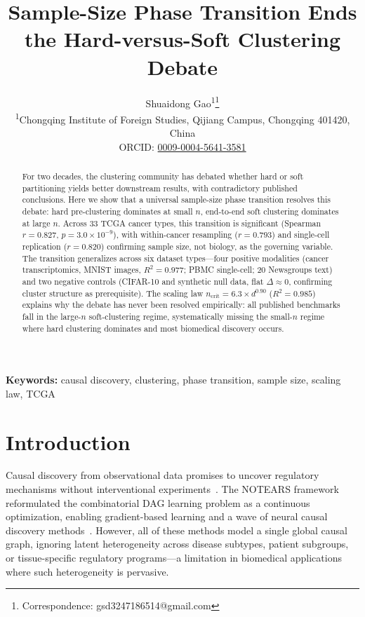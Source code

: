 \documentclass[12pt,a4paper]{article}
\title{Sample-Size Phase Transition Ends the Hard-versus-Soft Clustering Debate}
\author{Shuaidong Gao\textsuperscript{1}\thanks{Correspondence: gsd3247186514@gmail.com}\\
\textsuperscript{1}Chongqing Institute of Foreign Studies, Qijiang Campus, Chongqing 401420, China\\
ORCID: \href{https://orcid.org/0009-0004-5641-3581}{0009-0004-5641-3581}}
\date{}
\begin{document}
\doublespacing
\linenumbers
\maketitle

\begin{abstract}
For two decades, the clustering community has debated whether hard or soft partitioning yields better downstream results, with contradictory published conclusions. Here we show that a universal sample-size phase transition resolves this debate: hard pre-clustering dominates at small $n$, end-to-end soft clustering dominates at large $n$. Across 33 TCGA cancer types, this transition is significant (Spearman $r = 0.827$, $p = 3.0 \times 10^{-9}$), with within-cancer resampling ($r = 0.793$) and single-cell replication ($r = 0.820$) confirming sample size, not biology, as the governing variable. The transition generalizes across six dataset types---four positive modalities (cancer transcriptomics, MNIST images, $R^2 = 0.977$; PBMC single-cell; 20 Newsgroups text) and two negative controls (CIFAR-10 and synthetic null data, flat $\Delta \approx 0$, confirming cluster structure as prerequisite). The scaling law $n_{\text{crit}} = 6.3 \times d^{0.90}$ ($R^2 = 0.985$) explains why the debate has never been resolved empirically: all published benchmarks fall in the large-$n$ soft-clustering regime, systematically missing the small-$n$ regime where hard clustering dominates and most biomedical discovery occurs.
\end{abstract}

\noindent\textbf{Keywords:} causal discovery, clustering, phase transition, sample size, scaling law, TCGA

\section{Introduction}

Causal discovery from observational data promises to uncover regulatory mechanisms without interventional experiments~\cite{pearl2009causality, spirtes2000causation}. The NOTEARS framework~\cite{zheng2018dags} reformulated the combinatorial DAG learning problem as a continuous optimization, enabling gradient-based learning and a wave of neural causal discovery methods~\cite{yu2019daggnn, ng2020golem, lachapelle2019grandag, shimizu2006lingam, bello2022dagma, lippe2022causal}. However, all of these methods model a single global causal graph, ignoring latent heterogeneity across disease subtypes, patient subgroups, or tissue-specific regulatory programs---a limitation in biomedical applications where such heterogeneity is pervasive.
\end{document}

